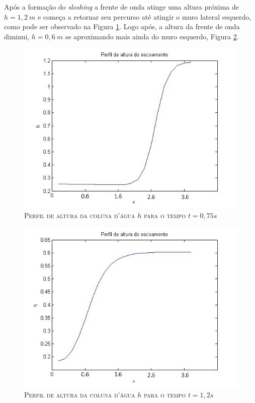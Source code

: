  Após a formação do \textit{sloshing} a frente de onda atinge uma altura próxima de $h=1,2 \ m$ e começa a retornar seu percurso até atingir o muro lateral esquerdo, como pode ser observado na Figura \ref{Alt75s}. Logo após, a altura da frente de onda diminui, $h=0,6 \ m$ se aproximando mais ainda do muro esquerdo, Figura \ref{Alt120s}.
  
 \begin{figure}[H]
 	\centering
 	\includegraphics[scale=1]{figuras/Alt75s.jpg}
 	\caption{\textsc{Perfil de altura da coluna d'água $h$ para o tempo $t=0,75s$}}
 	\label{Alt75s}
 \end{figure}
 
  \begin{figure}[H]
  	\centering
  	\includegraphics[scale=1]{figuras/Alt120s.jpg}
  	\caption{\textsc{Perfil de altura da coluna d'água $h$ para o tempo $t=1,2s$}}
  	\vspace{-0.1cm}
  	\label{Alt120s}
  \end{figure}
  
